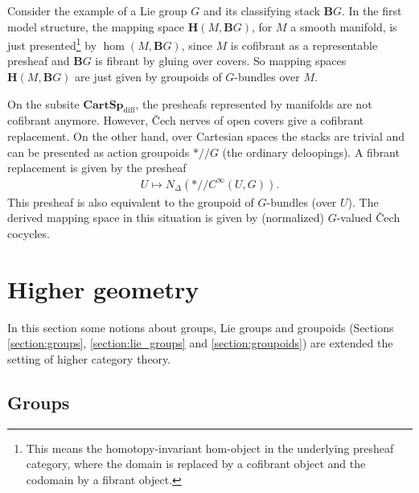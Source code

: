     \begin{example}
        Consider the example of a Lie group $G$ and its classifying stack $\mathbf{B}G$. In the first model structure, the mapping space $\mathbf{H}(M,\mathbf{B}G)$, for $M$ a smooth manifold, is just presented\footnote{This means the homotopy-invariant hom-object in the underlying presheaf category, where the domain is replaced by a cofibrant object and the codomain by a fibrant object.} by $\hom(M,\mathbf{B}G)$, since $M$ is cofibrant as a representable presheaf and $\mathbf{B}G$ is fibrant by gluing over covers. So mapping spaces $\mathbf{H}(M,\mathbf{B}G)$ are just given by groupoids of $G$-bundles over $M$.

        On the subsite $\mathbf{CartSp}_\mathrm{diff}$, the presheafs represented by manifolds are not cofibrant anymore. However, \v{C}ech nerves of open covers give a cofibrant replacement. On the other hand, over Cartesian spaces the stacks are trivial and can be presented as action groupoids $\ast/\!\!/G$ (the ordinary deloopings). A fibrant replacement is given by the presheaf
        \begin{gather}
            U\mapsto N_\Delta(\ast/\!\!/C^\infty(U,G)).
        \end{gather}
        This presheaf is also equivalent to the groupoid of $G$-bundles (over $U$). The derived mapping space in this situation is given by (normalized) $G$-valued \v{C}ech cocycles.
    \end{example}

\section{Higher geometry}

    In this section some notions about groups, Lie groups and groupoids (Sections \ref{section:groups}, \ref{section:lie_groups} and \ref{section:groupoids}) are extended the setting of higher category theory.

\subsection{Groups}


